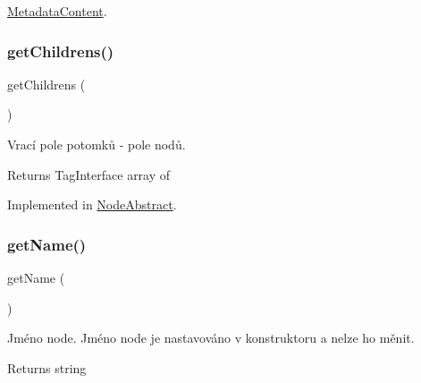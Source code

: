\mbox{\hyperlink{class_pes_1_1_dom_1_1_node_1_1_tag_1_1_metadata_content_a4722e7722b245351681b05d35f6694f3}{Metadata\+Content}}.

\mbox{\label{interface_pes_1_1_dom_1_1_node_1_1_node_interface_a97634dc0a1d163eb272a73543accaa92}} 
\subsubsection{\texorpdfstring{get\+Childrens()}{getChildrens()}}
{\footnotesize\ttfamily get\+Childrens (\begin{DoxyParamCaption}{ }\end{DoxyParamCaption})}

Vrací pole potomků -\/ pole nodů. \begin{DoxyReturn}{Returns}
Tag\+Interface array of 
\end{DoxyReturn}


Implemented in \mbox{\hyperlink{class_pes_1_1_dom_1_1_node_1_1_node_abstract_a97634dc0a1d163eb272a73543accaa92}{Node\+Abstract}}.

\mbox{\label{interface_pes_1_1_dom_1_1_node_1_1_node_interface_a3d0963e68bb313b163a73f2803c64600}} 
\subsubsection{\texorpdfstring{get\+Name()}{getName()}}
{\footnotesize\ttfamily get\+Name (\begin{DoxyParamCaption}{ }\end{DoxyParamCaption})}

Jméno node. Jméno node je nastavováno v konstruktoru a nelze ho měnit.

\begin{DoxyReturn}{Returns}
string 
\end{DoxyReturn}


